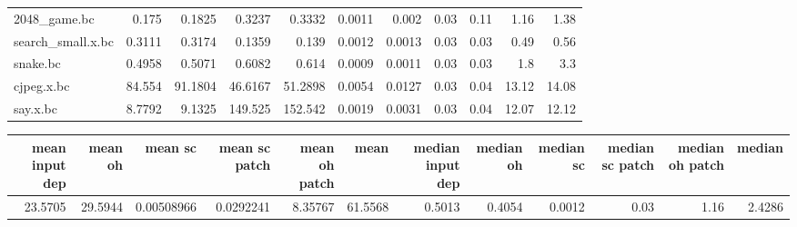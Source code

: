 \begin{tabular}{lrrrrrrrrrr}
 2048\_game.bc         &          0.175  &          0.1825 &   0.3237 &   0.3332 &   0.0011 &   0.002  &           0.03 &           0.11 &           1.16 &           1.38 \\
 search\_small.x.bc    &          0.3111 &          0.3174 &   0.1359 &   0.139  &   0.0012 &   0.0013 &           0.03 &           0.03 &           0.49 &           0.56 \\
 snake.bc             &          0.4958 &          0.5071 &   0.6082 &   0.614  &   0.0009 &   0.0011 &           0.03 &           0.03 &           1.8  &           3.3  \\
 cjpeg.x.bc           &         84.554  &         91.1804 &  46.6167 &  51.2898 &   0.0054 &   0.0127 &           0.03 &           0.04 &          13.12 &          14.08 \\
 say.x.bc             &          8.7792 &          9.1325 & 149.525  & 152.542  &   0.0019 &   0.0031 &           0.03 &           0.04 &          12.07 &          12.12 \\
\hline
\end{tabular}\begin{tabular}{rrrrrrrrrrrr}
\hline
   mean input dep &   mean oh &    mean sc &   mean sc patch &   mean oh patch &    mean &   median input dep &   median oh &   median sc &   median sc patch &   median oh patch &   median \\
\hline
          23.5705 &   29.5944 & 0.00508966 &       0.0292241 &         8.35767 & 61.5568 &             0.5013 &      0.4054 &      0.0012 &              0.03 &              1.16 &   2.4286 \\
\hline
\end{tabular}